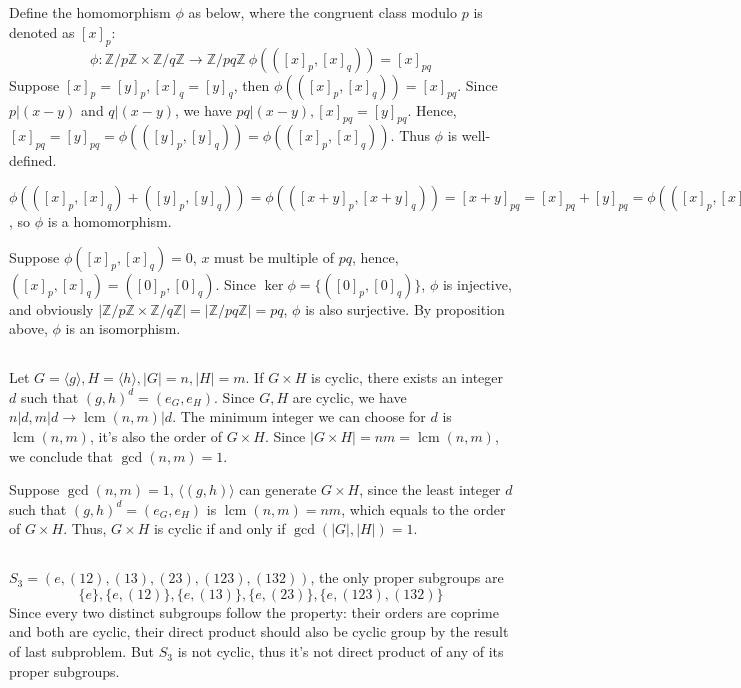 \documentclass[12pt]{article}
\title{\mytitle}
\author{\textbf{\myauthor}}
\date{}
\DeclareMathOperator{\lcm}{lcm}
\begin{document}
\onehalfspacing
\maketitle

\section{}
\subsection{}
Define the homomorphism $\phi$ as below, where the congruent class modulo $p$ is denoted as $[x]_p$:
$$\phi:\mathbb{Z}/p\mathbb{Z}\times \mathbb{Z}/q\mathbb{Z}\rightarrow \mathbb{Z}/pq\mathbb{Z}\ \phi(([x]_p,[x]_q))=[x]_{pq}$$
Suppose $[x]_p=[y]_p,[x]_q=[y]_q$, then $\phi(([x]_p,[x]_q))=[x]_{pq}$. Since $p|(x-y)$ and $q|(x-y)$, we have $pq|(x-y), [x]_{pq}=[y]_{pq}$. Hence, $[x]_{pq}=[y]_{pq}=\phi(([y]_{p},[y]_{q}))=\phi(([x]_p,[x]_q))$. Thus $\phi$ is well-defined.

$\phi(([x]_p,[x]_q)+([y]_p,[y]_q))=\phi(([x+y]_p,[x+y]_q))=[x+y]_{pq}=[x]_{pq}+[y]_{pq}=\phi(([x]_p,[x]_q))+\phi(([y]_p,[y]_q))$, so $\phi$ is a homomorphism.

Suppose $\phi([x]_p,[x]_q)=0$, $x$ must be multiple of $pq$, hence, $([x]_p,[x]_q)=([0]_p,[0]_q)$. Since $\ker{\phi}=\{([0]_p,[0]_q)\}$, $\phi$ is injective, and obviously $|\mathbb{Z}/p\mathbb{Z}\times \mathbb{Z}/q\mathbb{Z}|=|\mathbb{Z}/pq\mathbb{Z}|=pq$, $\phi$ is also surjective. By proposition above, $\phi$ is an isomorphism.
\subsection{}
Let $G=\langle g \rangle,H=\langle h\rangle, |G|=n, |H|=m$. If $G\times H$ is cyclic, there exists an integer $d$ such that $(g,h)^d=(e_G,e_H)$. Since $G,H$ are cyclic, we have $n|d,m|d\rightarrow\lcm{(n,m)}|d$. The minimum integer we can choose for $d$ is $\lcm{(n,m)}$, it's also the order of $G\times H$. Since $|G\times H|=nm=\lcm{(n,m)}$, we conclude that $\gcd{(n,m)}=1$.

Suppose $\gcd{(n,m)}=1$, $\langle (g,h)\rangle$ can generate $G\times H$, since the least integer $d$ such that $(g,h)^d=(e_G,e_H)$ is $\lcm{(n,m)}=nm$, which equals to the order of $G\times H$. Thus, $G\times H$ is cyclic if and only if $\gcd{(|G|,|H|)}=1$.
\subsection{}
$S_3=(e,(12),(13),(23),(123),(132))$, the only proper subgroups are 
$$\{e\}, \{e,(12)\}, \{e,(13)\},\{e, (23)\},\{e,(123),(132)\}$$
 Since every two distinct subgroups follow the property: their orders are coprime and both are cyclic, their direct product should also be cyclic group by the result of last subproblem. But $S_3$ is not cyclic, thus it's not direct product of any of its proper subgroups.
\end{document}
